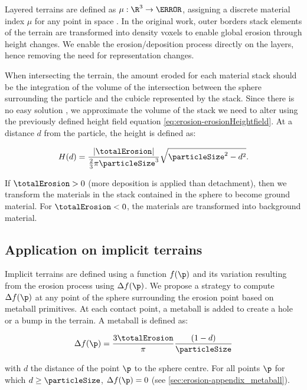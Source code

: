 Layered terrains are defined as $\mu: \R^3 \to \N$, assigning a discrete material index $\mu$ for any point in space \cite{Benes2001, Peytavie2009b}. In the original work, outer borders stack elements of the terrain are transformed into density voxels to enable global erosion through height changes. We enable the erosion/deposition process directly on the layers, hence removing the need for representation changes.

When intersecting the terrain, the amount eroded for each material stack should be the integration of the volume of the intersection between the sphere surrounding the particle and the cubicle represented by the stack. Since there is no easy solution \cite{Jones2017}, we approximate the volume of the stack we need to alter using the previously defined height field equation \eqref{eq:erosion-erosionHeightfield}.  
At a distance $d$ from the particle, the height is defined as:

\begin{align}
    \label{eq:erosion-erosionLayers}
    H(d) = \frac{|\totalErosion|}{\frac{2}{3} \pi \particleSize^3} \sqrt{\particleSize^2 - d^2}.
\end{align}

If $\totalErosion > 0$ (more deposition is applied than detachment), then we transform the materials in the stack contained in the sphere to become ground material. For $\totalErosion < 0$, the materials are transformed into background material.

\subsection{Application on implicit terrains}
\label{sec:erosion-application_on_implicit}

Implicit terrains are defined using a function $f(\p)$ and its variation resulting from the erosion process using $\Delta f(\p)$.  
We propose a strategy to compute $\Delta f(\p)$ at any point of the sphere surrounding the erosion point based on metaball primitives. At each contact point, a metaball is added to create a hole or a bump in the terrain. A metaball is defined as: 

\begin{align}
    \label{eq:erosion-erosionMetaball}
    \Delta f(\p) = \frac{3 \totalErosion}{\pi} \frac{(1 - d)}{\particleSize}
\end{align}

with $d$ the distance of the point $\p$ to the sphere centre. For all points $\p$ for which $d \geq \particleSize$, $\Delta f(\p) = 0$ (see \cref{sec:erosion-appendix_metaball}).

